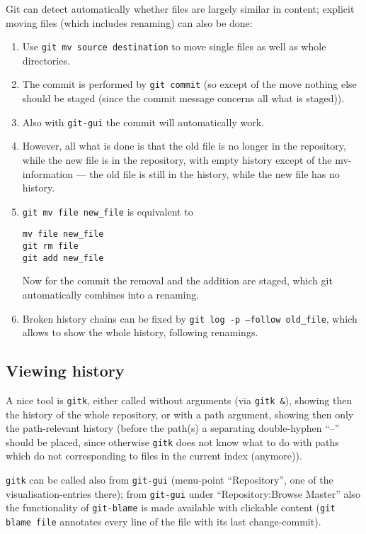 \documentclass{book}
\newcommand{\name}[1]{\texttt{#1}}
\begin{document}
Git can detect automatically whether files are largely similar in content; explicit moving files (which includes renaming) can also be done:
\begin{enumerate}
\item Use \texttt{git mv source destination} to move single files as well as whole directories.
\item The commit is performed by \texttt{git commit} (so except of the move nothing else should be staged (since the commit message concerns all what is staged)).
\item Also with \texttt{git-gui} the commit will automatically work.
\item However, all what is done is that the old file is no longer in the repository, while the new file is in the repository, with empty history except of the mv-information --- the old file is still in the history, while the new file has no history.
\item \texttt{git mv file new\_file} is equivalent to
\begin{verbatim}
mv file new_file
git rm file
git add new_file
\end{verbatim}
  Now for the commit the removal and the addition are staged, which git automatically combines into a renaming.
\item Broken history chains can be fixed by \texttt{git log -p --follow old\_file}, which allows to show the whole history, following renamings.
\end{enumerate}



\subsection{Viewing history}
\label{sec:GitViewinghistory}

A nice tool is \name{gitk}, either called without arguments (via \texttt{gitk \&}), showing then the history of the whole repository, or with a path argument, showing then only the path-relevant history (before the path(s) a separating double-hyphen ``--'' should be placed, since otherwise \name{gitk} does not know what to do with paths which do not corresponding to files in the current index (anymore)). 

\name{gitk} can be called also from \texttt{git-gui} (menu-point ``Repository'', one of the visualisation-entries there); from \texttt{git-gui} under ``Repository:Browse Master'' also the functionality of \texttt{git-blame} is made available with clickable content (\texttt{git blame file} annotates every line of the file with its last change-commit).
\end{document}
